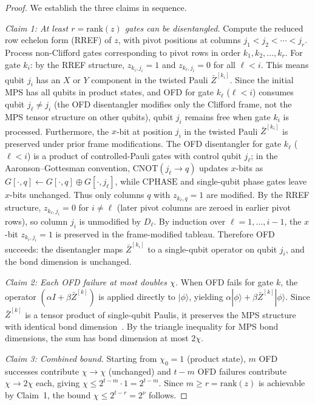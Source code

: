 \documentclass[a4paper,twocolumn,11pt]{quantumarticle}
\begin{document}
\begin{proof}
We establish the three claims in sequence.

\emph{Claim 1: At least $r = \mathrm{rank}(z)$ gates can be disentangled.}
Compute the reduced row echelon form (RREF) of $z$, with pivot positions at columns $j_1 < j_2 < \cdots < j_r$.
Process non-Clifford gates corresponding to pivot rows in order $k_1, k_2, \ldots, k_r$.
For gate $k_i$: by the RREF structure, $z_{k_i, j_i} = 1$ and $z_{k_\ell, j_i} = 0$ for all $\ell < i$.
This means qubit $j_i$ has an $X$ or $Y$ component in the twisted Pauli $\bar{Z}^{[k_i]}$.
Since the initial MPS has all qubits in product states, and OFD for gate $k_\ell$ ($\ell < i$) consumes qubit $j_\ell \ne j_i$ (the OFD disentangler modifies only the Clifford frame, not the MPS tensor structure on other qubits), qubit $j_i$ remains free when gate $k_i$ is processed.
Furthermore, the $x$-bit at position $j_i$ in the twisted Pauli $\bar{Z}^{[k_i]}$ is preserved under prior frame modifications.
The OFD disentangler for gate $k_\ell$ ($\ell < i$) is a product of controlled-Pauli gates with control qubit $j_\ell$; in the Aaronson--Gottesman convention, $\mathrm{CNOT}(j_\ell \to q)$ updates $x$-bits as $G[\cdot,q] \leftarrow G[\cdot,q] \oplus G[\cdot,j_\ell]$, while $\mathrm{CPHASE}$ and single-qubit phase gates leave $x$-bits unchanged.
Thus only columns $q$ with $z_{k_\ell, q} = 1$ are modified.
By the RREF structure, $z_{k_\ell, j_i} = 0$ for $i \ne \ell$ (later pivot columns are zeroed in earlier pivot rows), so column $j_i$ is unmodified by $D_\ell$.
By induction over $\ell = 1, \ldots, i-1$, the $x$-bit $z_{k_i, j_i} = 1$ is preserved in the frame-modified tableau.
Therefore OFD succeeds: the disentangler maps $\bar{Z}^{[k_i]}$ to a single-qubit operator on qubit $j_i$, and the bond dimension is unchanged.

\emph{Claim 2: Each OFD failure at most doubles $\chi$.}
When OFD fails for gate $k$, the operator $(\alpha I + \beta \bar{Z}^{[k]})$ is applied directly to $|\phi\rangle$, yielding $\alpha|\phi\rangle + \beta \bar{Z}^{[k]}|\phi\rangle$.
Since $\bar{Z}^{[k]}$ is a tensor product of single-qubit Paulis, it preserves the MPS structure with identical bond dimension~\cite{Schollwock2011}.
By the triangle inequality for MPS bond dimensions, the sum has bond dimension at most $2\chi$.

\emph{Claim 3: Combined bound.}
Starting from $\chi_0 = 1$ (product state), $m$ OFD successes contribute $\chi \to \chi$ (unchanged) and $t - m$ OFD failures contribute $\chi \to 2\chi$ each, giving $\chi \le 2^{t-m} \cdot 1 = 2^{t-m}$.
Since $m \ge r = \mathrm{rank}(z)$ is achievable by Claim~1, the bound $\chi \le 2^{t-r} = 2^\nu$ follows.
\end{proof}
\end{document}
